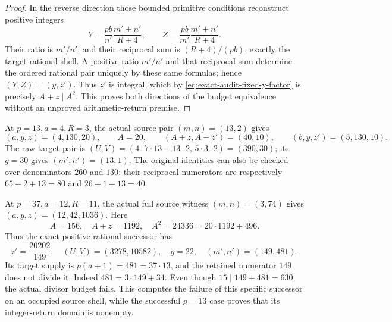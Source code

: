 \begin{proof}
In the reverse direction those bounded primitive conditions reconstruct
positive integers
\[
 Y=\frac{pb}{n'}\frac{m'+n'}{R+4},\qquad
 Z=\frac{pb}{m'}\frac{m'+n'}{R+4}.
\]
Their ratio is \(m'/n'\), and their reciprocal sum is
\((R+4)/(pb)\), exactly the target rational shell. A positive
ratio \(m'/n'\) and that reciprocal sum determine the ordered rational
pair uniquely by these same formulas; hence \((Y,Z)=(y,z')\).
Thus \(z'\) is integral, which by
\eqref{eq:exact-audit-fixed-y-factor} is precisely \(A+z\mid A^2\).
This proves both directions of the budget equivalence without an
unproved arithmetic-return premise.
\end{proof}

At \(p=13,a=4,R=3\), the actual source pair \((m,n)=(13,2)\)
gives
\[
 (a,y,z)=(4,130,20),\qquad A=20,\qquad
 (A+z,A-z')=(40,10),\qquad (b,y,z')=(5,130,10).
\]
The raw target pair is
\((U,V)=(4\cdot7\cdot13+13\cdot2,\,5\cdot3\cdot2)
=(390,30)\); its \(g=30\) gives \((m',n')=(13,1)\).
The original identities can also be checked over denominators
\(260\) and \(130\): their reciprocal numerators are respectively
\(65+2+13=80\) and \(26+1+13=40\).

At \(p=37,a=12,R=11\), the actual full source witness
\((m,n)=(3,74)\) gives \((a,y,z)=(12,42,1036)\).
Here
\[
 A=156,\quad A+z=1192,\quad A^2=24336
 =20\cdot1192+496.
\]
Thus the exact positive rational successor has
\[
 z'=\frac{20202}{149},\quad
 (U,V)=(3278,10582),\quad g=22,\quad(m',n')=(149,481).
\]
Its target supply is \(p(a+1)=481=37\cdot13\), and the retained
numerator \(149\) does not divide it. Indeed \(481=3\cdot149+34\).
Even though \(15\mid149+481=630\), the actual divisor budget fails.
This computes the failure of this specific successor on an occupied
source shell, while the successful \(p=13\) case proves that its
integer-return domain is nonempty.
